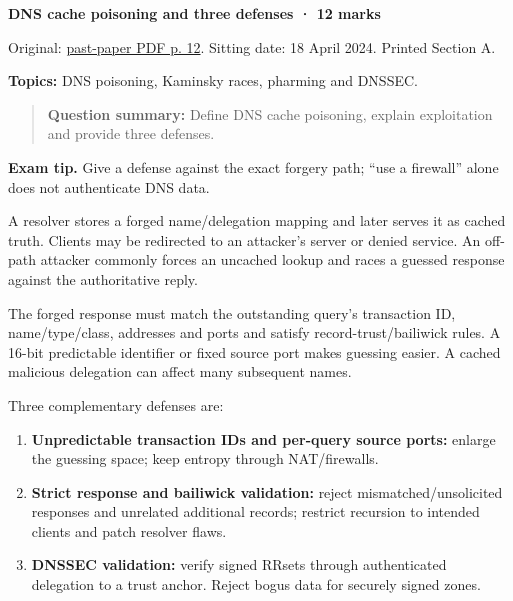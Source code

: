\documentclass[11pt,a4paper]{article}
\begin{document}
\textbf{DNS cache poisoning and three defenses · 12 marks}


Original: \href{../../CSE405-Security_Merged.pdf\#page=12}{past-paper PDF p. 12}. Sitting date: 18 April 2024. Printed Section A.


\textbf{Topics:} DNS poisoning,\allowbreak{} Kaminsky races,\allowbreak{} pharming and DNSSEC.



\begin{quote}\small

\textbf{Question summary:} Define DNS cache poisoning,\allowbreak{} explain exploitation and provide three defenses.



\end{quote}


{\color{ForestGreen}\textbf{Exam tip.} Give a defense against the exact forgery path; “use a firewall” alone does not authenticate DNS data.}


A resolver stores a forged name/\allowbreak{}delegation mapping and later serves it as cached truth. Clients may be redirected to an attacker's server or denied service. An off-path attacker commonly forces an uncached lookup and races a guessed response against the authoritative reply.


The forged response must match the outstanding query's transaction ID,\allowbreak{} name/\allowbreak{}type/\allowbreak{}class,\allowbreak{} addresses and ports and satisfy record-trust/\allowbreak{}bailiwick rules. A 16-bit predictable identifier or fixed source port makes guessing easier. A cached malicious delegation can affect many subsequent names.


Three complementary defenses are:



\begin{enumerate}

\item \textbf{Unpredictable transaction IDs and per-query source ports:} enlarge the guessing space; keep entropy through NAT/\allowbreak{}firewalls.

\item \textbf{Strict response and bailiwick validation:} reject mismatched/\allowbreak{}unsolicited responses and unrelated additional records; restrict recursion to intended clients and patch resolver flaws.

\item \textbf{DNSSEC validation:} verify signed RRsets through authenticated delegation to a trust anchor. Reject bogus data for securely signed zones.

\end{enumerate}
\end{document}
